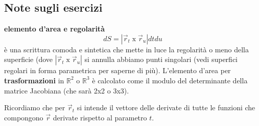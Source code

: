 \subsection*{Note sugli esercizi}
\begin{tcolorbox}
\textbf{elemento d'area e regolarità}
\[
    dS = |\vec{r}_t \; \text{x}\; \vec{r}_u| dt du
\]
è una scrittura comoda e sintetica che mette in luce la regolarità o meno della superficie (dove $|\vec{r}_t \; \text{x}\; \vec{r}_u|$ si annulla abbiamo punti singolari (vedi superfici regolari in forma parametrica per saperne di più).\newline
\newline
L'elemento d'area per \textbf{trasformazioni} in $\mathbb{R}^2$ o $\mathbb{R}^3$ è calcolato come il modulo del determinante della matrice Jacobiana (che sarà 2x2 o 3x3).
\end{tcolorbox}
Ricordiamo che per $\vec{r}_t$ si intende il vettore delle derivate di tutte le funzioni che compongono $\vec{r}$ derivate rispetto al parametro $t$.\newline
